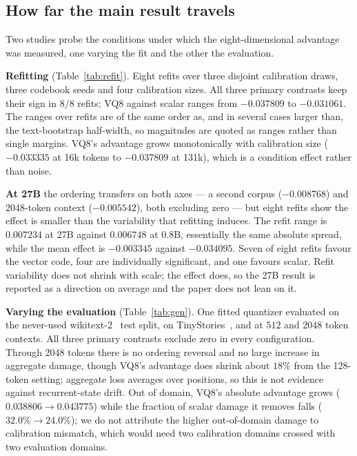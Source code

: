 \documentclass[11pt]{article}
\begin{document}
\subsection{How far the main result travels}

Two studies probe the conditions under which the eight-dimensional advantage
was measured, one varying the fit and the other the evaluation.

\textbf{Refitting} (Table~\ref{tab:refit}). Eight refits over three disjoint
calibration draws, three codebook seeds and four calibration sizes. All three
primary contrasts keep their sign in $8/8$ refits; VQ8 against scalar ranges
from $-0.037809$ to $-0.031061$. The ranges over refits are of the same order
as, and in several cases larger than, the text-bootstrap half-width, so
magnitudes are quoted as ranges rather than single margins. VQ8's advantage
grows monotonically with calibration size ($-0.033335$ at 16k tokens to
$-0.037809$ at 131k), which is a condition effect rather than noise.

\textbf{At 27B} the ordering transfers on both axes --- a second corpus
($-0.008768$) and 2048-token context ($-0.005542$), both excluding zero --- but
eight refits show the effect is smaller than the variability that refitting
induces. The refit range is $0.007234$ at 27B against $0.006748$ at 0.8B,
essentially the same absolute spread, while the mean effect is
$-0.003345$ against $-0.034095$. Seven of eight refits favour the vector code,
four are individually significant, and one favours scalar. Refit variability
does not shrink with scale; the effect does, so the 27B result is reported as
a direction on average and the paper does not lean on it.

\textbf{Varying the evaluation} (Table~\ref{tab:gen}). One fitted quantizer
evaluated on the never-used wikitext-2~\cite{wikitext} test split, on
TinyStories~\cite{tinystories}, and at $512$ and $2048$ token contexts. All three primary contrasts exclude zero in
every configuration. Through 2048 tokens there is no ordering reversal and no
large increase in aggregate damage, though VQ8's advantage does shrink about
$18\%$ from the 128-token setting; aggregate loss averages over positions, so
this is not evidence against recurrent-state drift. Out of domain, VQ8's
absolute advantage grows ($0.038806 \to 0.043775$) while the fraction of scalar
damage it removes falls ($32.0\%\to24.0\%$); we do not attribute the higher
out-of-domain damage to calibration mismatch, which would need two calibration
domains crossed with two evaluation domains.
\end{document}
